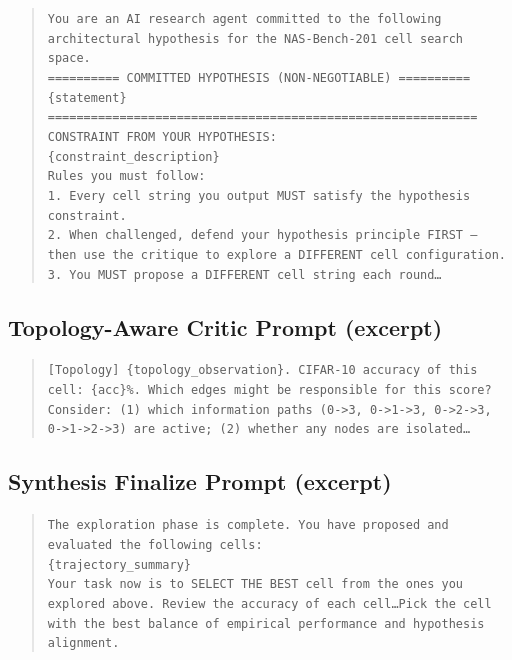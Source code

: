 \documentclass[10pt]{article}
\begin{document}
\begin{quote}
\small
\texttt{You are an AI research agent committed to the following architectural
hypothesis for the NAS-Bench-201 cell search space.}\\[4pt]
\texttt{========== COMMITTED HYPOTHESIS (NON-NEGOTIABLE) ==========}\\
\texttt{\{statement\}}\\
\texttt{============================================================}\\[4pt]
\texttt{CONSTRAINT FROM YOUR HYPOTHESIS:}\\
\texttt{\{constraint\_description\}}\\[4pt]
\texttt{Rules you must follow:}\\
\texttt{1. Every cell string you output MUST satisfy the hypothesis constraint.}\\
\texttt{2. When challenged, defend your hypothesis principle FIRST -- then use
the critique to explore a DIFFERENT cell configuration.}\\
\texttt{3. You MUST propose a DIFFERENT cell string each round\ldots}
\end{quote}

\subsection{Topology-Aware Critic Prompt (excerpt)}

\begin{quote}
\small
\texttt{[Topology] \{topology\_observation\}. CIFAR-10 accuracy of this cell:
\{acc\}\%. Which edges might be responsible for this score? Consider: (1) which
information paths (0->3, 0->1->3, 0->2->3, 0->1->2->3) are active; (2) whether
any nodes are isolated\ldots}
\end{quote}

\subsection{Synthesis Finalize Prompt (excerpt)}

\begin{quote}
\small
\texttt{The exploration phase is complete. You have proposed and evaluated the
following cells:}\\
\texttt{\{trajectory\_summary\}}\\[4pt]
\texttt{Your task now is to SELECT THE BEST cell from the ones you explored
above. Review the accuracy of each cell\ldots Pick the cell with the best
balance of empirical performance and hypothesis alignment.}
\end{quote}
\end{document}

